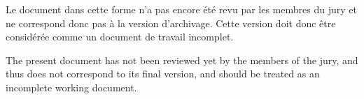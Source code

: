 \documentclass[../../Main_ManuscritThese.tex]{subfiles}
\begin{document}
\pagestyle{empty}

\vfill Le document dans cette forme n'a pas encore été revu par les
membres du jury et ne correspond donc pas à la version
d'archivage. Cette version doit donc être considérée comme un document
de travail incomplet.

\vfill \markchapterend \vfill

The present document has not been reviewed yet by the members of the
jury, and thus does not correspond to its final version, and should be
treated as an incomplete working document.  \vfill
\end{document}
